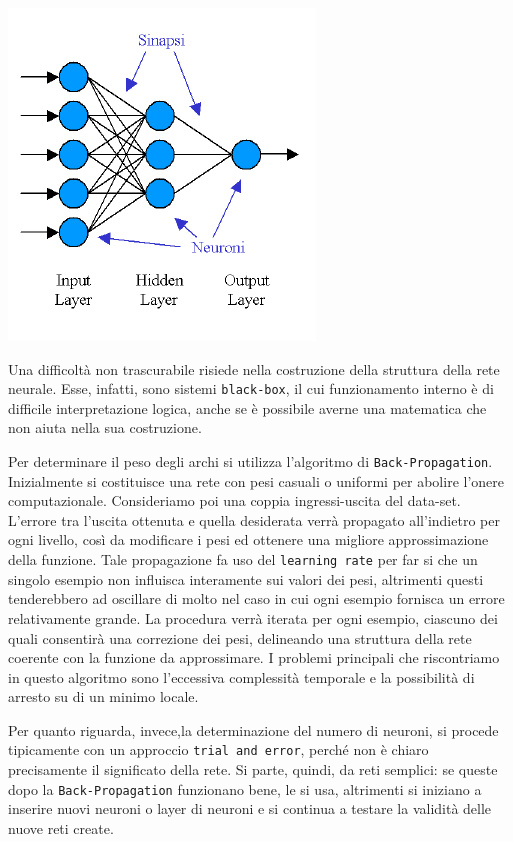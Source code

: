 			\begin{center}
				\includegraphics[scale=0.6]{RN-multilayer.jpg}
			\end{center}
			\par
			Una difficoltà non trascurabile risiede nella costruzione della struttura della rete neurale. Esse, infatti, sono sistemi \texttt{black-box}, il cui funzionamento interno è di difficile interpretazione logica, anche se è possibile averne una matematica che non aiuta nella sua costruzione.
			\par
			Per determinare il peso degli archi si utilizza l'algoritmo di \texttt{Back-Propagation}. Inizialmente si costituisce una rete con pesi casuali o uniformi per abolire l'onere computazionale. Consideriamo poi una coppia ingressi-uscita del data-set. L'errore tra l'uscita ottenuta e quella desiderata verrà propagato all'indietro per ogni  livello, così da modificare i pesi ed ottenere una migliore approssimazione della funzione. Tale propagazione fa uso del \texttt{learning rate} per far si che un singolo esempio non influisca interamente sui valori dei pesi, altrimenti questi tenderebbero ad oscillare di molto nel caso in cui ogni esempio fornisca un errore relativamente grande. La procedura verrà iterata per ogni esempio, ciascuno dei quali consentirà una correzione dei pesi, delineando una struttura della rete coerente con la funzione da approssimare. I problemi principali che riscontriamo in questo algoritmo sono l'eccessiva complessità temporale e la possibilità di arresto su di un minimo locale.\par
			Per quanto riguarda, invece,la determinazione del numero di neuroni, si procede tipicamente con un approccio \texttt{trial and error}, perché non è chiaro precisamente il significato della rete. Si parte, quindi, da reti semplici: se queste dopo la \texttt{Back-Propagation} funzionano bene, le si usa, altrimenti si iniziano a inserire nuovi neuroni o layer di neuroni e si continua a testare la validità delle nuove reti create.\par
